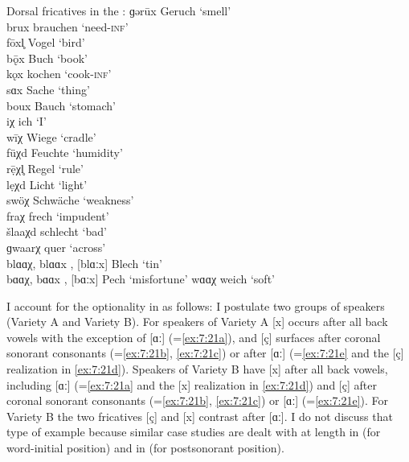 \ea%
\label{ex:7:21}Dorsal fricatives in the :
\ea\label{ex:7:21a} ɡərūx \tab [gəruːx] \tab Geruch \tab ‘smell’ \\
brux \tab [brux] \tab brauchen \tab ‘need\textsc{{}-inf}’ \\
fōxl̥ \tab [foːxl̩] \tab Vogel \tab ‘bird’ \\
bǭx \tab [bɔːx] \tab Buch \tab ‘book’ \\
kǫx \tab [kɔx] \tab kochen \tab ‘cook\textsc{{}-inf}’ \\
sɑx \tab [sɑx] \tab Sache \tab ‘thing’ \\
boux \tab [boux] \tab Bauch \tab ‘stomach’ \\
\ex\label{ex:7:21b} iχ \tab  [iç] \tab ich \tab ‘I’ \\
wīχ \tab [βiːç] \tab Wiege \tab ‘cradle’ \\
füχd \tab [fyçt] \tab Feuchte \tab ‘humidity’ \\
rẹ̄χl̥ \tab [reːçl̩] \tab Regel \tab ‘rule’ \\
lẹχd \tab [leçt] \tab Licht \tab ‘light’ \\
swöχ \tab [sβøç] \tab Schwäche \tab ‘weakness’ \\
fraχ \tab  [fræç] \tab frech \tab ‘impudent’ \\
šlaaχd \tab [ʃlæːçt] \tab schlecht \tab ‘bad’ \\
\ex\label{ex:7:21c} ɡwaarχ \tab [kβæːrç] \tab quer \tab ‘across’ \\
\ex\label{ex:7:21d} blɑɑχ, blɑɑx \tab [blɑːç], [blɑːx] \tab Blech \tab ‘tin’ \\
bɑɑχ, bɑɑx \tab [bɑːç], [bɑːx] \tab Pech \tab ‘misfortune’ 
\ex\label{ex:7:21e} wɑɑχ \tab [βɑːç] \tab weich \tab ‘soft’ 
\z
\z 

I account for the optionality in  as follows: I postulate two groups of speakers (Variety A and Variety B). For speakers of Variety A [x] occurs after all back vowels with the exception of [ɑː] (=\ref{ex:7:21a}), and [ç] surfaces after coronal sonorant consonants (=\ref{ex:7:21b}, \ref{ex:7:21c}) or after [ɑː] (=\ref{ex:7:21e} and the [ç] realization in \ref{ex:7:21d}). Speakers of Variety B have [x] after all back vowels, including [ɑː] (=\ref{ex:7:21a} and the [x] realization in \ref{ex:7:21d}) and [ç] after coronal sonorant consonants (=\ref{ex:7:21b}, \ref{ex:7:21c}) or [ɑː] (=\ref{ex:7:21e}). For Variety B the two fricatives [ç] and [x] contrast after [ɑː]. I do not discuss that type of example because similar case studies are dealt with at length in  (for word-initial position) and in  (for postsonorant position).

